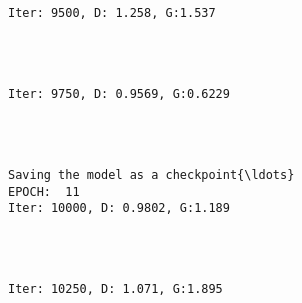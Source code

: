 \documentclass[11pt]{article}
\begin{document}
    \begin{center}
    \end{center}
    { \hspace*{\fill} \\}
    
    \begin{Verbatim}[commandchars=\\\{\}]

Iter: 9500, D: 1.258, G:1.537
    \end{Verbatim}

    \begin{center}
    \end{center}
    { \hspace*{\fill} \\}
    
    \begin{Verbatim}[commandchars=\\\{\}]

Iter: 9750, D: 0.9569, G:0.6229
    \end{Verbatim}

    \begin{center}
    \end{center}
    { \hspace*{\fill} \\}
    
    \begin{Verbatim}[commandchars=\\\{\}]

Saving the model as a checkpoint{\ldots}
EPOCH:  11
Iter: 10000, D: 0.9802, G:1.189
    \end{Verbatim}

    \begin{center}
    \end{center}
    { \hspace*{\fill} \\}
    
    \begin{Verbatim}[commandchars=\\\{\}]

Iter: 10250, D: 1.071, G:1.895
    \end{Verbatim}
\end{document}
